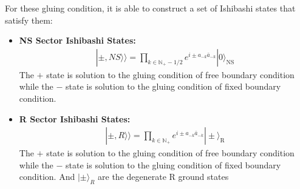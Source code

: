 %
For these gluing condition, it is able to construct a set of Ishibashi states that satisfy them:
\begin{itemize}
  \item \textbf{NS Sector Ishibashi States:}
    \begin{align}
    |\pm,NS\rangle\rangle=\prod_{k\in\mathbb{N}_+-1/2}e^{i\pm a_{-k}\bar{a}_{-k}}|0\rangle_{\mathrm{NS}}
    \end{align}
    The $ + $ state is solution to the gluing condition of free boundary condition while the $ - $ state is solution to the gluing condition of fixed boundary condition.
  \item \textbf{R Sector Ishibashi States:}
    \begin{align}
|\pm,R \rangle\rangle=\prod_{k\in\mathbb{N}_+}e^{i\pm a_{-k}\bar{a}_{-k}}|\pm\rangle_{\mathrm{R}}
    \end{align}
    The $ + $ state is solution to the gluing condition of free boundary condition while the $ - $ state is solution to the gluing condition of fixed boundary condition. And $ |\pm\rangle_R $ are the degenerate R ground states
\end{itemize}

